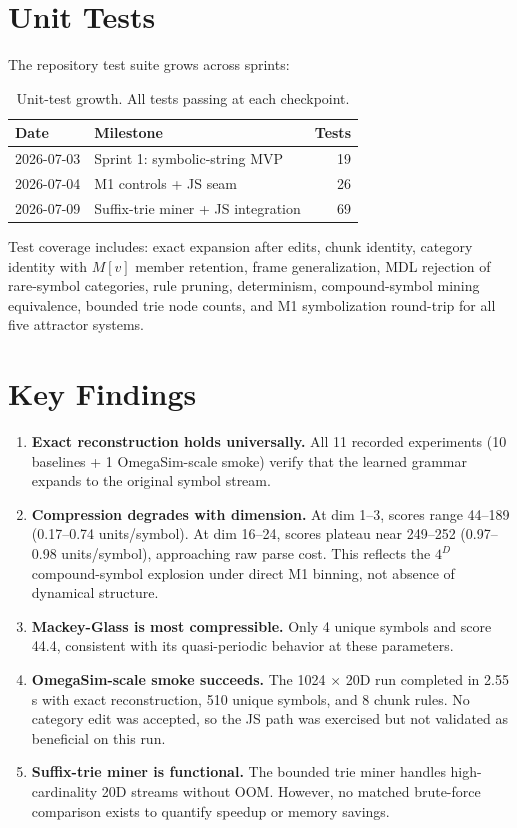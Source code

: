 \documentclass[11pt]{article}
\begin{document}
\section{Unit Tests}

The repository test suite grows across sprints:

\begin{table}[ht]
\centering
\begin{tabular}{llr}
\toprule
Date & Milestone & Tests \\
\midrule
2026-07-03 & Sprint 1: symbolic-string MVP & 19 \\
2026-07-04 & M1 controls + JS seam & 26 \\
2026-07-09 & Suffix-trie miner + JS integration & 69 \\
\bottomrule
\end{tabular}
\caption{Unit-test growth. All tests passing at each checkpoint.}
\end{table}

Test coverage includes: exact expansion after edits, chunk identity, category identity with $M[v]$ member retention, frame generalization, MDL rejection of rare-symbol categories, rule pruning, determinism, compound-symbol mining equivalence, bounded trie node counts, and M1 symbolization round-trip for all five attractor systems.

\section{Key Findings}

\begin{enumerate}
\item \textbf{Exact reconstruction holds universally.} All 11 recorded experiments (10 baselines + 1 OmegaSim-scale smoke) verify that the learned grammar expands to the original symbol stream.

\item \textbf{Compression degrades with dimension.} At dim 1--3, scores range 44--189 (0.17--0.74 units/symbol). At dim 16--24, scores plateau near 249--252 (0.97--0.98 units/symbol), approaching raw parse cost. This reflects the $4^D$ compound-symbol explosion under direct M1 binning, not absence of dynamical structure.

\item \textbf{Mackey-Glass is most compressible.} Only 4 unique symbols and score 44.4, consistent with its quasi-periodic behavior at these parameters.

\item \textbf{OmegaSim-scale smoke succeeds.} The 1024 $\times$ 20D run completed in 2.55 s with exact reconstruction, 510 unique symbols, and 8 chunk rules. No category edit was accepted, so the JS path was exercised but not validated as beneficial on this run.

\item \textbf{Suffix-trie miner is functional.} The bounded trie miner handles high-cardinality 20D streams without OOM. However, no matched brute-force comparison exists to quantify speedup or memory savings.
\end{enumerate}
\end{document}
